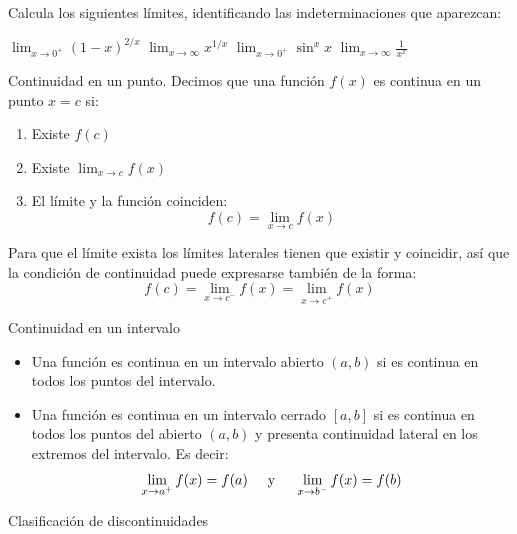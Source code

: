 \begin{ejemplo}{
    Calcula los siguientes límites, identificando las indeterminaciones que aparezcan:
    \begin{apartadosc}
        \ap $\displaystyle{
                \lim_{x\to0^+}(1-x)^{2/x}
            }$
        \ap $\displaystyle{
                \lim_{x\to\infty}x^{1/x}
            }$
        \ap $\displaystyle{
                \lim_{x\to0^+}\sin^x{x}
            }$
        \ap $\displaystyle{
                \lim_{x\to\infty}\frac1{x^x}
            }$
    \end{apartadosc}
}
\end{ejemplo}



\begin{definicion}{Continuidad en un punto.}
Decimos que una función $f(x)$ es continua en un punto $x=c$ si:
\begin{enumerate}
    \item Existe $f(c)$
    \item Existe $\displaystyle{\lim_{x\to c}f(x)}$
    \item El límite y la función coinciden:
        \[f(c)=\lim_{x\to c}f(x)\]
\end{enumerate}
Para que el límite exista los límites laterales tienen que existir y coincidir, así que la condición de continuidad puede expresarse también de la forma:
\[f(c)=\lim_{x\to c^-}f(x)=\lim_{x\to c^+}f(x)\]
\end{definicion}

\begin{definicion}{Continuidad en un intervalo}
\begin{itemize}
    \item Una función es continua en un intervalo abierto $(a,b)$ si es continua en todos los puntos del intervalo.
    \item Una función es continua en un intervalo cerrado $[a,b]$ si es continua en todos los puntos del abierto $(a,b)$ y presenta continuidad lateral en los extremos del intervalo. Es decir:
    \[
        \lim_{x\to a^+}f(x)=f(a)
            \hspace{5mm}\text{y}\hspace{5mm}
        \lim_{x\to b^-}f(x)=f(b)
    \]   
\end{itemize}
\end{definicion}

\begin{definicion}{Clasificación de discontinuidades}
\end{definicion}

